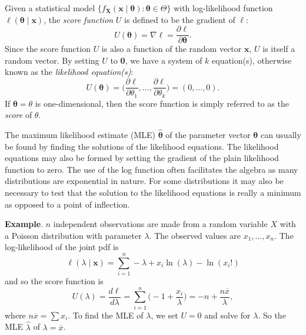 \documentclass[12pt]{article}
\begin{document}
Given a statistical model $\lbrace f_{\mathbf{X}}(\boldsymbol{x}\mid\boldsymbol{\theta}) : \boldsymbol{\theta} \in \Theta \rbrace$ with log-likelihood function $\ell(\boldsymbol{\theta}\mid\boldsymbol{x})$, the \emph{score function} $U$ is defined to be the gradient of $\ell$:
$$U(\boldsymbol{\theta})=\nabla\ell=\frac{\partial\ell}{\partial\boldsymbol{\theta}}.$$
Since the score function $U$ is also a function of the random vector $\boldsymbol{x}$, $U$ is itself a random vector.
By setting $U$ to \textbf{0}, we have a system of $k$ equation(s), otherwise known as the \emph{likelihood equation(s)}:
$$U(\boldsymbol{\theta})=\Big(\frac{\partial\ell}{\partial\theta_1},\ldots,\frac{\partial\ell}{\partial\theta_k}\Big)= (0,\ldots,0).$$
If $\boldsymbol{\theta}=\theta$ is one-dimensional, then the score function is simply referred to as the \emph{score} of $\theta$.

The maximum likelihood estimate (MLE) $\hat{\boldsymbol{\theta}}$ of the parameter vector $\boldsymbol{\theta}$ can usually be found by finding the solutions of the likelihood equations. The likelihood equations may also be formed by setting the gradient of the plain likelihood function to zero. The use of the log function often facilitates the algebra as many distributions are exponential in nature. For some distributions it may also be necessary to test that the solution to the likelihood equations is really a minimum as opposed to a point of inflection.

\textbf{Example}.  $n$ independent observations are made from a random variable $X$ with a Poisson distribution with parameter $\lambda$.  The observed values are $x_1,\ldots,x_n$.  The log-likelihood of the joint pdf is 
$$\ell(\lambda\mid\boldsymbol{x})=\sum_{i=1}^{n}-\lambda+x_i\ln(\lambda)-\ln(x_i!)$$ 
and so the score function is 
$$U(\lambda)=\frac{d\ell}{d\lambda}=\sum_{i=1}^{n}\big(-1+\frac{x_i}{\lambda}\big)=-n+\frac{n\overline{x}}{\lambda},$$  
where $n\overline{x}=\sum x_i$.  To find the MLE of $\lambda$, we set $U=0$ and solve for $\lambda$.  So the MLE $\hat{\lambda}$ of $\lambda=\overline{x}$.
\end{document}
